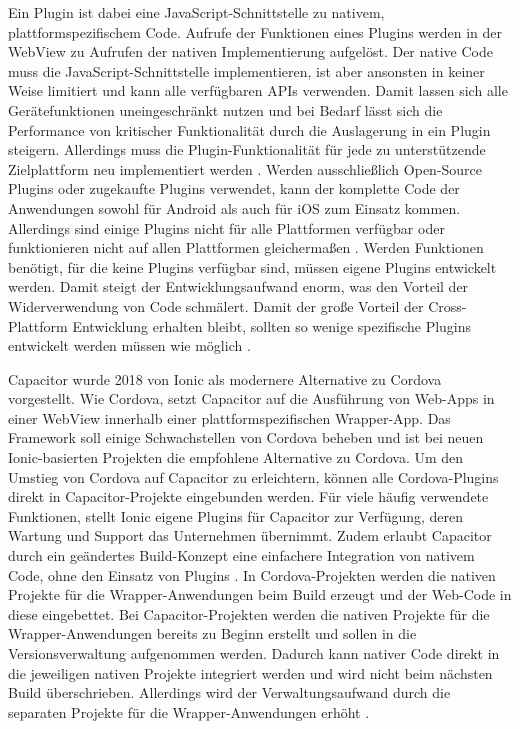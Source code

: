 Ein Plugin ist dabei eine JavaScript-Schnittstelle zu nativem, plattformspezifischem Code.
Aufrufe der Funktionen eines Plugins werden in der WebView zu Aufrufen der nativen Implementierung aufgelöst.
Der native Code muss die JavaScript-Schnittstelle implementieren, ist aber ansonsten in keiner Weise limitiert und kann alle verfügbaren \acp{API} verwenden.
Damit lassen sich alle Gerätefunktionen uneingeschränkt nutzen und bei Bedarf lässt sich die Performance von kritischer Funktionalität durch die Auslagerung in ein Plugin steigern.
Allerdings muss die Plugin-Funktionalität für jede zu unterstützende Zielplattform neu implementiert werden \cite{Steyer_Cordova}.
Werden ausschließlich Open-Source Plugins oder zugekaufte Plugins verwendet, kann der komplette Code der Anwendungen sowohl für Android als auch für iOS zum Einsatz kommen.
Allerdings sind einige Plugins nicht für alle Plattformen verfügbar oder funktionieren nicht auf allen Plattformen gleichermaßen \cite{Cordova_Plugin_Problem}.
Werden Funktionen benötigt, für die keine Plugins verfügbar sind, müssen eigene Plugins entwickelt werden.
Damit steigt der Entwicklungsaufwand enorm, was den Vorteil der Widerverwendung von Code schmälert.
Damit der große Vorteil der Cross-Plattform Entwicklung erhalten bleibt, sollten so wenige spezifische Plugins entwickelt werden müssen wie möglich \cite{Cordova_Development_Tips}.


Capacitor wurde 2018 von Ionic als modernere Alternative zu Cordova vorgestellt.
Wie Cordova, setzt Capacitor auf die Ausführung von Web-Apps in einer WebView innerhalb einer plattformspezifischen Wrapper-App.
Das Framework soll einige Schwachstellen von Cordova beheben und ist bei neuen Ionic-basierten Projekten die empfohlene Alternative zu Cordova.
Um den Umstieg von Cordova auf Capacitor zu erleichtern, können alle Cordova-Plugins direkt in Capacitor-Projekte eingebunden werden.
Für viele häufig verwendete Funktionen, stellt Ionic eigene Plugins für Capacitor zur Verfügung, deren Wartung und Support das Unternehmen übernimmt.
Zudem erlaubt Capacitor durch ein geändertes Build-Konzept eine einfachere Integration von nativem Code, ohne den Einsatz von Plugins \cite{Ionic_Cordova_vs_Capacitor}.
In Cordova-Projekten werden die nativen Projekte für die Wrapper-Anwendungen beim Build erzeugt und der Web-Code in diese eingebettet.
Bei Capacitor-Projekten werden die nativen Projekte für die Wrapper-Anwendungen bereits zu Beginn erstellt und sollen in die Versionsverwaltung aufgenommen werden.
Dadurch kann nativer Code direkt in die jeweiligen nativen Projekte integriert werden und wird nicht beim nächsten Build überschrieben.
Allerdings wird der Verwaltungsaufwand durch die separaten Projekte für die Wrapper-Anwendungen erhöht \cite{Liebel_Cordova_Capacitor}.


